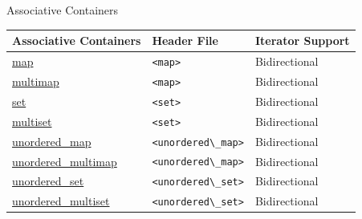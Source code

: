 \documentclass[14pt,aspectratio=1610]{beamer}
\begin{document}
\begin{frame}{Associative Containers}
  \renewcommand{\arraystretch}{1.1}
  \begin{tabular}{l l l}
  \toprule
  \textbf{Associative Containers} & \textbf{Header File} & \textbf{Iterator Support}\\
  \midrule

    \href{https://en.cppreference.com/w/cpp/container/map}{map}
      & \lstinline{<map>} & Bidirectional\\
    \href{https://en.cppreference.com/w/cpp/container/multimap}{multimap}
      & \lstinline{<map>} & Bidirectional\\
    \href{https://en.cppreference.com/w/cpp/container/set}{set}
      & \lstinline{<set>} & Bidirectional\\
    \href{https://en.cppreference.com/w/cpp/container/multiset}{multiset}
      & \lstinline{<set>} & Bidirectional\\
  \midrule
    \href{https://en.cppreference.com/w/cpp/container/unordered_map}{unordered\_map}
      & \lstinline{<unordered\_map>} & Bidirectional\\
    \href{https://en.cppreference.com/w/cpp/container/unordered_multimap}{unordered\_multimap}
      & \lstinline{<unordered\_map>} & Bidirectional\\
    \href{https://en.cppreference.com/w/cpp/container/unordered_set}{unordered\_set}
      & \lstinline{<unordered\_set>} & Bidirectional\\
    \href{https://en.cppreference.com/w/cpp/container/unordered_multiset}{unordered\_multiset}
      & \lstinline{<unordered\_set>} & Bidirectional\\
  \bottomrule
\end{tabular}

\end{frame}
\end{document}
